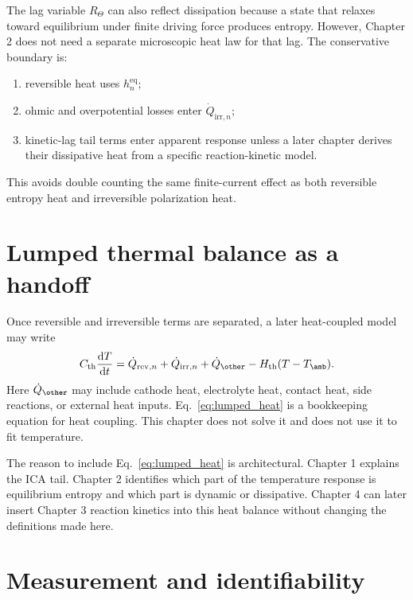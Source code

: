\documentclass[11pt,a4paper]{article}
\newcommand{\dd}{\mathrm{d}}
\newcommand{\eqs}{\mathrm{eq}}
\newcommand{\rev}{\mathrm{rev}}
\newcommand{\irr}{\mathrm{irr}}
\newcommand{\thm}{\mathrm{th}}
\begin{document}
The lag variable \(R_{\Theta}\) can also reflect dissipation because a state that relaxes toward equilibrium
under finite driving force produces entropy. However, Chapter 2 does not need a separate microscopic heat
law for that lag. The conservative boundary is:
\begin{enumerate}[leftmargin=2em]
\item reversible heat uses \(h_n^{\eqs}\);
\item ohmic and overpotential losses enter \(\dot Q_{\irr,n}\);
\item kinetic-lag tail terms enter apparent response unless a later chapter derives their dissipative heat
      from a specific reaction-kinetic model.
\end{enumerate}
This avoids double counting the same finite-current effect as both reversible entropy heat and irreversible
polarization heat.

\section{Lumped thermal balance as a handoff}\label{sec:thermal_balance}

Once reversible and irreversible terms are separated, a later heat-coupled model may write
\begin{equation}
C_{\thm}\frac{\dd T}{\dd t}
=
\dot Q_{\rev,n}
+
\dot Q_{\irr,n}
+
\dot Q_{\other}
-
H_{\thm}(T-T_{\amb}).
\label{eq:lumped_heat}
\end{equation}
Here \(\dot Q_{\other}\) may include cathode heat, electrolyte heat, contact heat, side reactions, or external
heat inputs. Eq.~\eqref{eq:lumped_heat} is a bookkeeping equation for heat coupling. This chapter does not
solve it and does not use it to fit temperature.

The reason to include Eq.~\eqref{eq:lumped_heat} is architectural. Chapter 1 explains the ICA tail.
Chapter 2 identifies which part of the temperature response is equilibrium entropy and which part is dynamic
or dissipative. Chapter 4 can later insert Chapter 3 reaction kinetics into this heat balance without changing
the definitions made here.

\section{Measurement and identifiability}\label{sec:measurement}
\end{document}
